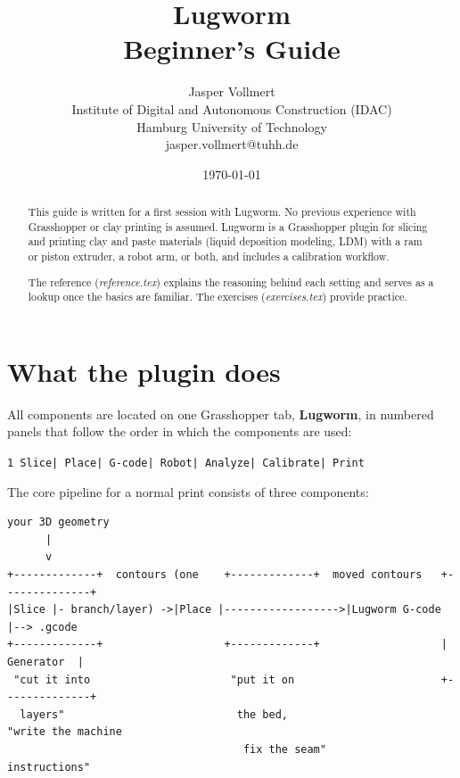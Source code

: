 \documentclass[11pt]{article}
\title{\color{lugwormblue}\textbf{Lugworm}\\[0.3em]\Large Beginner's Guide}
\author{Jasper Vollmert \\ \small Institute of Digital and Autonomous Construction (IDAC) \\ \small Hamburg University of Technology \\ \small jasper.vollmert@tuhh.de}
\date{\small \today}
\begin{document}
\maketitle

\begin{abstract}
\noindent This guide is written for a first session with Lugworm.
No previous experience with Grasshopper or clay printing is assumed.
Lugworm is a Grasshopper plugin for slicing and printing clay and
paste materials (liquid deposition modeling, LDM) with a ram or piston
extruder, a robot arm, or both, and includes a calibration workflow.

The reference (\emph{reference.tex}) explains the reasoning behind each
setting and serves as a lookup once the basics are familiar. The
exercises (\emph{exercises.tex}) provide practice.
\end{abstract}

\tableofcontents
\newpage

\section{What the plugin does}

All components are located on one Grasshopper tab, \textbf{Lugworm}, in
numbered panels that follow the order in which the components are used:

\begin{center}
\texttt{1 Slice\quad| Place\quad| G-code\quad| Robot\quad| Analyze\quad| Calibrate\quad| Print}
\end{center}

The core pipeline for a normal print consists of three components:

\begin{verbatim}
your 3D geometry
      |
      v
+-------------+  contours (one    +-------------+  moved contours   +--------------+
|Slice |- branch/layer) ->|Place |------------------>|Lugworm G-code |--> .gcode
+-------------+                   +-------------+                   |   Generator  |
 "cut it into                      "put it on                       +--------------+
  layers"                           the bed,                         "write the machine
                                     fix the seam"                    instructions"
\end{verbatim}
\end{document}
